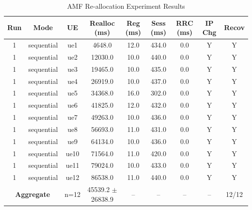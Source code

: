 \begin{table}[ht]
\centering
\begin{tabular}{|c|c|c|c|c|c|c|c|c|}
\hline
Run & Mode & UE & Realloc (ms) & Reg (ms) & Sess (ms) & RRC (ms) & IP Chg & Recov \\
\hline
1 & sequential & ue1 & 4648.0 & 12.0 & 434.0 & 0.0 & Y & Y \\
1 & sequential & ue2 & 12030.0 & 10.0 & 440.0 & 0.0 & Y & Y \\
1 & sequential & ue3 & 19465.0 & 10.0 & 435.0 & 0.0 & Y & Y \\
1 & sequential & ue4 & 26919.0 & 10.0 & 437.0 & 0.0 & Y & Y \\
1 & sequential & ue5 & 34368.0 & 16.0 & 302.0 & 0.0 & Y & Y \\
1 & sequential & ue6 & 41825.0 & 12.0 & 432.0 & 0.0 & Y & Y \\
1 & sequential & ue7 & 49263.0 & 10.0 & 436.0 & 0.0 & Y & Y \\
1 & sequential & ue8 & 56693.0 & 11.0 & 431.0 & 0.0 & Y & Y \\
1 & sequential & ue9 & 64134.0 & 10.0 & 436.0 & 0.0 & Y & Y \\
1 & sequential & ue10 & 71564.0 & 11.0 & 420.0 & 0.0 & Y & Y \\
1 & sequential & ue11 & 79024.0 & 10.0 & 433.0 & 0.0 & Y & Y \\
1 & sequential & ue12 & 86538.0 & 11.0 & 440.0 & 0.0 & Y & Y \\
\multicolumn{2}{|c|}{\textbf{Aggregate}} & n=12 & 45539.2 $\pm$ 26838.9 & -- & -- & -- & -- & 12/12 \\
\hline
\end{tabular}
\caption{AMF Re-allocation Experiment Results}
\label{tab:amf_realloc}
\end{table}
